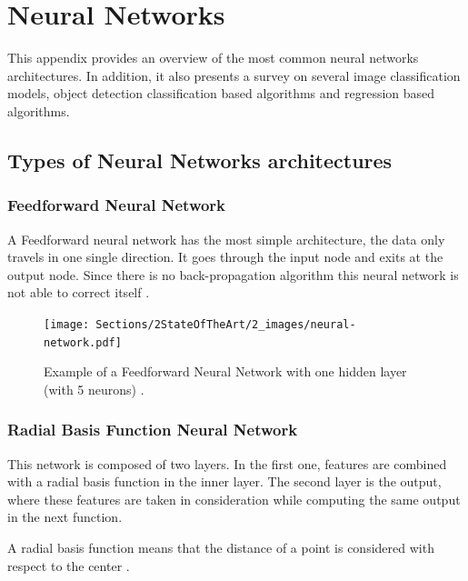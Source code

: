 \appendix
\chapter{Neural Networks}

\label{ch:appendix}

This appendix provides an overview of the most common neural networks architectures. In addition, it also presents a survey on several image classification models, object detection classification based algorithms and regression based algorithms.
\section{Types of Neural Networks architectures}

            \subsection{Feedforward Neural Network}
            
            \par A Feedforward neural network has the most simple architecture, the data only travels in one single direction. It goes through the input node and exits at the output node. Since there is no back-propagation algorithm this neural network is not able to correct itself \cite{ArmaanMerchant2018} \cite{VikasGupta2017}.

            \begin{figure}[H]
                \centering
                \captionsetup{justification=centering}
                \texttt{[image: Sections/2StateOfTheArt/2\_images/neural-network.pdf]}
                \caption[Feedforward Neural Network]{Example of a Feedforward Neural Network with one hidden layer (with 5 neurons) \cite{neural_image}. }  
            \end{figure}

            \subsection{Radial Basis Function Neural Network}

            \par This network is composed of two layers. In the first one, features are combined with a radial basis function in the inner layer. The second layer is the output, where these features are taken in consideration while computing the same output in the next function.
            \par A radial basis function means that the distance of a point is considered with respect to the center \cite{ArmaanMerchant2018}.


